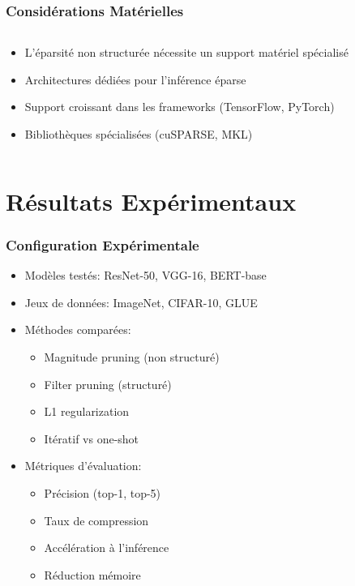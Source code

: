 \documentclass[10pt]{beamer}
\begin{document}
\begin{frame}
\frametitle{Considérations Matérielles}
\begin{columns}
\begin{column}{0.6\textwidth}
\begin{itemize}
    \item L'éparsité non structurée nécessite un support matériel spécialisé
    \item Architectures dédiées pour l'inférence éparse
    \item Support croissant dans les frameworks (TensorFlow, PyTorch)
    \item Bibliothèques spécialisées (cuSPARSE, MKL)
\end{itemize}
\end{column}
\begin{column}{0.4\textwidth}
\centering
{}
\end{column}
\end{columns}
\end{frame}

\section{Résultats Expérimentaux}

\begin{frame}
\frametitle{Configuration Expérimentale}
\begin{itemize}
    \item Modèles testés: ResNet-50, VGG-16, BERT-base
    \item Jeux de données: ImageNet, CIFAR-10, GLUE
    \item Méthodes comparées:
    \begin{itemize}
        \item Magnitude pruning (non structuré)
        \item Filter pruning (structuré)
        \item L1 regularization
        \item Itératif vs one-shot
    \end{itemize}
    \item Métriques d'évaluation:
    \begin{itemize}
        \item Précision (top-1, top-5)
        \item Taux de compression
        \item Accélération à l'inférence
        \item Réduction mémoire
    \end{itemize}
\end{itemize}
\end{frame}
\end{document}
